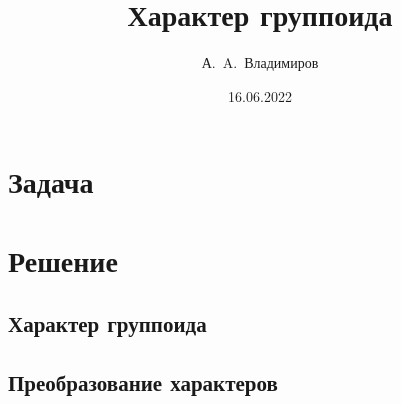 \documentclass[11pt]{article}
\theoremstyle{plain}
\theoremstyle{definition}
\theoremstyle{remark}
\begin{document}
\author{А.~A.~Владимиров}
\title{Характер группоида}
\date{16.06.2022}
\maketitle

\section*{Задача}


\section*{Решение}
\tableofcontents

\subsection{Характер группоида}
            
\newpage    
\newpage    
\newpage    
\newpage    
\subsection{Преобразование характеров}
\newpage    
            
            
\end{document}
